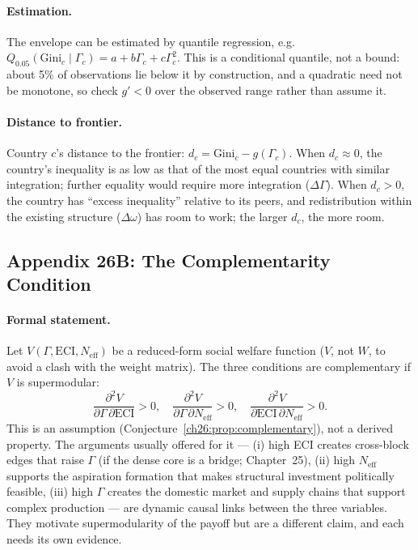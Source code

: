 \documentclass[../structural_economics_book.tex]{subfiles}
\begin{document}
\paragraph{Estimation.} The envelope can be estimated by quantile regression, e.g.\ $Q_{0.05}(\text{Gini}_c \mid \Gamma_c) = a + b\Gamma_c + c\Gamma_c^2$. This is a conditional quantile, not a bound: about 5\% of observations lie below it by construction, and a quadratic need not be monotone, so check $g' < 0$ over the observed range rather than assume it.

\paragraph{Distance to frontier.} Country $c$'s distance to the frontier: $d_c = \text{Gini}_c - g(\Gamma_c)$. When $d_c \approx 0$, the country's inequality is as low as that of the most equal countries with similar integration; further equality would require more integration ($\Delta\Gamma$). When $d_c > 0$, the country has ``excess inequality'' relative to its peers, and redistribution within the existing structure ($\Delta\omega$) has room to work; the larger $d_c$, the more room.


\subsection*{Appendix 26B: The Complementarity Condition}
\label{ch26:app:complementarity}

\paragraph{Formal statement.} Let $V(\Gamma, \text{ECI}, N_{\text{eff}})$ be a reduced-form social welfare function ($V$, not $W$, to avoid a clash with the weight matrix). The three conditions are complementary if $V$ is supermodular:
\begin{equation}
\frac{\partial^2 V}{\partial\Gamma\,\partial\text{ECI}} > 0, \quad \frac{\partial^2 V}{\partial\Gamma\,\partial N_{\text{eff}}} > 0, \quad \frac{\partial^2 V}{\partial\text{ECI}\,\partial N_{\text{eff}}} > 0.
\end{equation}
This is an assumption (Conjecture~\ref{ch26:prop:complementary}), not a derived property. The arguments usually offered for it --- (i) high ECI creates cross-block edges that raise $\Gamma$ (if the dense core is a bridge; Chapter~25), (ii) high $N_{\text{eff}}$ supports the aspiration formation that makes structural investment politically feasible, (iii) high $\Gamma$ creates the domestic market and supply chains that support complex production --- are dynamic causal links between the three variables. They motivate supermodularity of the payoff but are a different claim, and each needs its own evidence.
\end{document}
